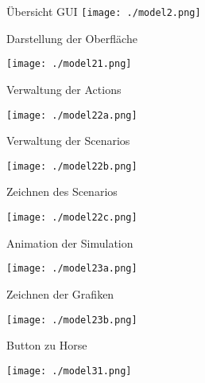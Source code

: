 \newcommand\tab[1][1cm]{\hspace*{#1}}
\graphicspath{{images/}{images/logos/}}
\begin{frame}{Übersicht GUI}
		\texttt{[image: ./model2.png]}
\end{frame}

\begin{frame}{Darstellung der Oberfläche}
	\begin{center}
		\texttt{[image: ./model21.png]}
	\end{center}
\end{frame}

\begin{frame}{Verwaltung der Actions}
	\begin{center}
		\texttt{[image: ./model22a.png]}
	\end{center}
\end{frame}


\begin{frame}{Verwaltung der Scenarios}
	\begin{center}
		\texttt{[image: ./model22b.png]}
	\end{center}
\end{frame}


\begin{frame}{Zeichnen des Scenarios}
	\begin{center}
		\texttt{[image: ./model22c.png]}
	\end{center}
\end{frame}


\begin{frame}{Animation der Simulation}
	\begin{center}
		\texttt{[image: ./model23a.png]}
	\end{center}
\end{frame}

\begin{frame}{Zeichnen der Grafiken}
	\begin{center}
		\texttt{[image: ./model23b.png]}
	\end{center}
\end{frame}


\begin{frame}{Button zu Horse}
	\begin{center}
		\texttt{[image: ./model31.png]}
	\end{center}
\end{frame}


